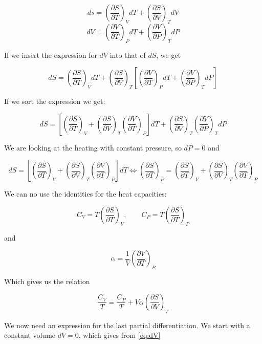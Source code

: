 \documentclass[a4paper,norsk, 10pt]{article}
\newcommand{\pd}[2]{\frac{\partial #1}{\partial #2}}
\begin{document}
\begin{equation}
ds = \left(\pd{S}{T}\right)_V dT + \left(\pd{S}{V}\right)_T dV
\label{eq:ds}
\end{equation}
\begin{equation}
dV = \left(\pd{V}{T}\right)_P dT + \left(\pd{V}{P}\right)_T dP
\label{eq:dV}
\end{equation}

If we insert the expression for $dV$ into that of $dS$, we get

\begin{equation}
dS = \left(\pd{S}{T}\right)_V dT + \left(\pd{S}{V}\right)_T\left[\left(\pd{V}{T}\right)_P dT + \left(\pd{V}{P}\right)_T dP\right]
\end{equation}

If we sort the expression we get:

\begin{equation}
dS = \left[\left(\pd{S}{T}\right)_V + \left(\pd{S}{V}\right)_T\left(\pd{V}{T}\right)_P\right]dT + \left(\pd{S}{V}\right)_T\left(\pd{V}{P}\right)_T dP
\end{equation}

We are looking at the heating with constant pressure, so $dP = 0$ and

\begin{equation}
dS = \left[\left(\pd{S}{T}\right)_V + \left(\pd{S}{V}\right)_T\left(\pd{V}{T}\right)_P\right]dT \Leftrightarrow \left(\pd{S}{T}\right)_P = \left(\pd{S}{T}\right)_V + \left(\pd{S}{V}\right)_T\left(\pd{V}{T}\right)_P
\end{equation}

We can no use the identities for the heat capacities:

\begin{equation}
C_V = T\left(\pd{S}{T}\right)_V, \qquad C_P = T\left(\pd{S}{T}\right)_P
\label{eq:heatCap}
\end{equation}

and

\begin{equation}
\alpha = \frac{1}{V}\left(\pd{V}{T}\right)_P
\label{eq:alpha}
\end{equation}

Which gives us the relation

\begin{equation}
\frac{C_V}{T} = \frac{C_P}{T} + V\alpha \left(\pd{S}{V}\right)_T
\label{eq:almost}
\end{equation}

We now need an expression for the last partial differentiation. We start with a constant volume $dV = 0$, which gives from \eqref{eq:dV}
\end{document}

